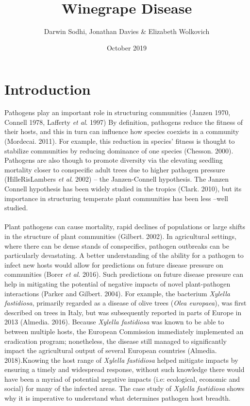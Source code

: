 \documentclass[11pt,letter]{article}
\begin{document}
\title{Winegrape Disease}
\author{Darwin Sodhi, Jonathan Davies & Elizabeth Wolkovich }
\date{October 2019}


\maketitle

\section{Introduction}
Pathogens play an important role in structuring communities (Janzen 1970, Connell 1978, Lafferty \textit{et al}. 1997) By definition, pathogens reduce the fitness of their hosts, and this in turn can influence how species coexists in a community (Mordecai. 2011). For example, this reduction in species’ fitness is thought to stabilize communities by reducing dominance of one species (Chesson. 2000). Pathogens are also though to promote diversity via the elevating seedling mortality closer to conspecific adult trees due to higher pathogen pressure (HilleRisLambers \textit{et al}. 2002) – the Janzen-Connell hypothesis. The Janzen Connell hypothesis has been widely studied in the tropics (Clark. 2010), but its importance in structuring temperate plant communities has been less –well studied. 
\paragraph{}Plant pathogens can cause mortality, rapid declines of populations or large shifts in the structure of plant communities (Gilbert. 2002). In agricultural settings, where there can be dense stands of conspecifics, pathogen outbreaks can be particularly devastating. A better understanding of the ability for a pathogen to infect new hosts would allow for predictions on future disease pressure on communities (Borer \textit{et al}. 2016). Such predictions on future disease pressure can help in mitigating the potential of negative impacts of novel plant-pathogen interactions (Parker and Gilbert. 2004). For example, the bacterium \textit{Xylella fastidiosa}, primarily regarded as a disease of olive trees (\textit{Olea europaea}), was first described on trees in Italy, but was subsequently reported in parts of Europe in 2013 (Almedia. 2016). Because \textit{Xylella fastidiosa} was known to be able to between multiple hosts, the European Commission immediately implemented an eradication program; nonetheless, the disease still managed to significantly impact the agricultural output of several European countries (Almedia. 2018).Knowing the host range of \textit{Xylella fastidiosa} helped mitigate impacts by ensuring a timely and widespread response, without such knowledge there would have been a myriad of potential negative impacts (i.e: ecological, economic and social) for many of the infected areas.  The case study of \textit{Xylella fastidiosa} shows why it is imperative to understand what determines pathogen host breadth.
\end{document}
